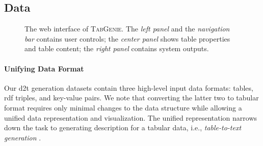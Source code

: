 \subsection{Data}
\label{sec:tabgenie:data}

\begin{figure}[t]
    \centering
    \setlength{\fboxsep}{0pt}
    \caption{The web interface of \textsc{TabGenie}. The \emph{left panel} and the \emph{navigation bar} contains user controls; the \emph{center panel} shows table properties and table content; the \emph{right panel} contains system outputs.}
    \label{fig:tabgenie:web}
\end{figure}


\paragraph{Unifying Data Format}
Our \ac{d2t} generation datasets contain three high-level input data formats: tables, \acs{rdf} triples, and key-value pairs. We note that converting the latter two to tabular format requires only minimal changes to the data structure while allowing a unified data representation and visualization. The unified representation narrows down the task to generating description for a tabular data, i.e., \emph{table-to-text generation} \cite{parikhToTToControlledTableToText2020,liuPLOGTabletoLogicPretraining2022,gongTableGPTFewshotTabletoText2020}.

